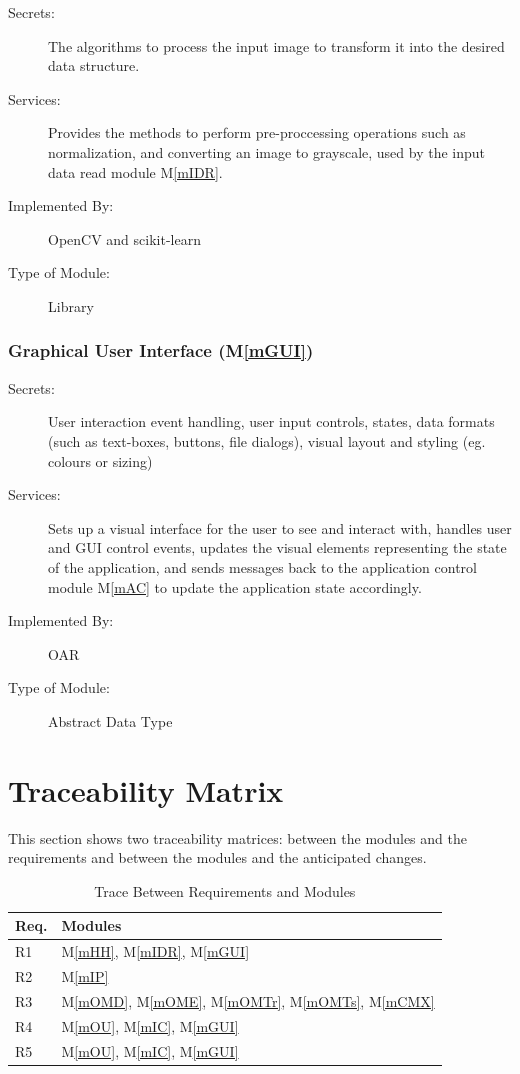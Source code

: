 \documentclass[12pt, titlepage]{article}
\newcommand{\mref}[1]{M\ref{#1}}
\begin{document}
\begin{description}
\item[Secrets:] The algorithms to process the input image to transform it into the desired data structure.
\item[Services:] Provides the methods to perform pre-proccessing operations such as normalization, and converting an image to grayscale,
used by the input data read module \mref{mIDR}.
\item[Implemented By:] OpenCV and scikit-learn
\item[Type of Module:] Library
\end{description}

\subsubsection{Graphical User Interface (\mref{mGUI})}

\begin{description}
\item[Secrets:] User interaction event handling, user input controls, states, data formats (such as text-boxes, buttons, file dialogs),
visual layout and styling (eg. colours or sizing)
\item[Services:] Sets up a visual interface for the user to see and interact with, handles user and GUI control events, updates the 
visual elements representing the state of the application, and sends messages back to the application control module \mref{mAC} to update
the application state accordingly.
\item[Implemented By:] OAR
\item[Type of Module:] Abstract Data Type
\end{description}

\section{Traceability Matrix} \label{SecTM}

This section shows two traceability matrices: between the modules and the
requirements and between the modules and the anticipated changes.

\begin{table}[H]
\centering
\begin{tabular}{p{} p{}}
\toprule
\textbf{Req.} & \textbf{Modules}\\
\midrule
R1 & \mref{mHH}, \mref{mIDR}, \mref{mGUI}\\
R2 & \mref{mIP}\\
R3 & \mref{mOMD}, \mref{mOME}, \mref{mOMTr}, \mref{mOMTs}, \mref{mCMX}\\
R4 & \mref{mOU}, \mref{mIC}, \mref{mGUI}\\
R5 & \mref{mOU}, \mref{mIC}, \mref{mGUI}\\
\bottomrule
\end{tabular}
\caption{Trace Between Requirements and Modules}
\label{TblRT}
\end{table}
\end{document}
